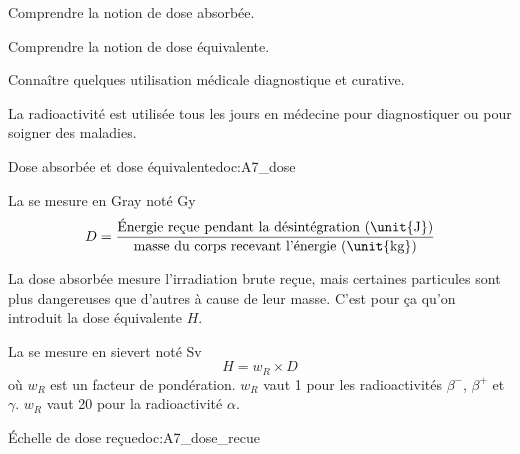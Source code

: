 \teteTermStssImag

\vspace*{-24pt}

\begin{objectifs}
  \item Comprendre la notion de dose absorbée.
  \item Comprendre la notion de dose équivalente.
  \item Connaître quelques utilisation médicale diagnostique et curative.
\end{objectifs}

\begin{contexte}
  La radioactivité est utilisée tous les jours en médecine pour diagnostiquer ou pour soigner des maladies.
  
\end{contexte}


\begin{doc}{Dose absorbée et dose équivalente}{doc:A7_dose}
  \begin{importants}
    La  se mesure en Gray noté \unit{\gray}
    \begin{equation*}
      D =
      \dfrac{\text{Énergie reçue pendant la désintégration (\unit{J})}}
      {\text{masse du corps recevant l'énergie (\unit{kg})}}
    \end{equation*}
  \end{importants}
  
  La dose absorbée mesure l'irradiation brute reçue, mais certaines particules sont plus dangereuses que d'autres à cause de leur masse.
  C'est pour ça qu'on introduit la dose équivalente $H$.
  \begin{importants}
    La  se mesure en sievert noté \unit{\sievert}
    \begin{equation*}
      H = w_R \times D
    \end{equation*}
    où $w_R$ est un facteur de pondération. $w_R$ vaut 1 pour les radioactivités $\beta^-$, $\beta^+$ et $\gamma$.
    $w_R$ vaut 20 pour la radioactivité $\alpha$.
  \end{importants}
\end{doc}

\begin{doc}{Échelle de dose reçue}{doc:A7_dose_recue}
  \centering
\end{doc}

